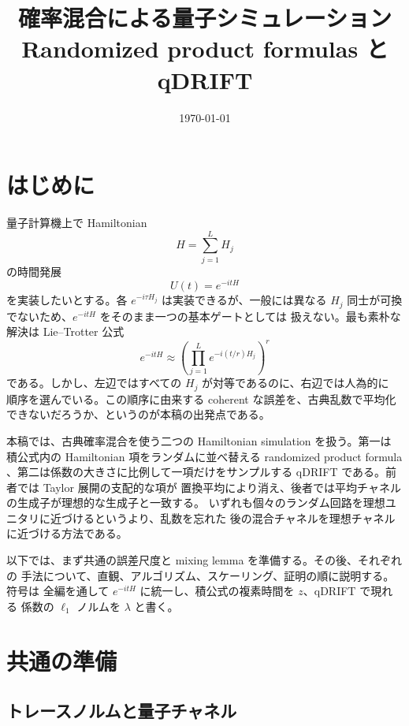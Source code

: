 \documentclass[uplatex,dvipdfmx,11pt,a4paper]{jsarticle}
\title{確率混合による量子シミュレーション\\
  \large Randomized product formulas と qDRIFT}
\author{}
\date{\today}
\begin{document}
\maketitle
\tableofcontents

\section{はじめに}

量子計算機上で Hamiltonian
\begin{equation}
  H=\sum_{j=1}^{L}H_j
\end{equation}
の時間発展
\begin{equation}
  U(t)=e^{-itH}
\end{equation}
を実装したいとする。各 $e^{-i\tau H_j}$ は実装できるが、一般には異なる
$H_j$ 同士が可換でないため、$e^{-itH}$ をそのまま一つの基本ゲートとしては
扱えない。最も素朴な解決は Lie--Trotter 公式
\begin{equation}
  e^{-itH}
  \approx
  \left(\prod_{j=1}^{L}e^{-i(t/r)H_j}\right)^r
\end{equation}
である。しかし、左辺ではすべての $H_j$ が対等であるのに、右辺では人為的に
順序を選んでいる。この順序に由来する coherent な誤差を、古典乱数で平均化
できないだろうか、というのが本稿の出発点である。

本稿では、古典確率混合を使う二つの Hamiltonian simulation を扱う。第一は
積公式内の Hamiltonian 項をランダムに並べ替える randomized product formula
\cite{Childs2019Faster}、第二は係数の大きさに比例して一項だけをサンプルする
qDRIFT \cite{Campbell2019Random} である。前者では Taylor 展開の支配的な項が
置換平均により消え、後者では平均チャネルの生成子が理想的な生成子と一致する。
いずれも個々のランダム回路を理想ユニタリに近づけるというより、乱数を忘れた
後の混合チャネルを理想チャネルに近づける方法である。

以下では、まず共通の誤差尺度と mixing lemma を準備する。その後、それぞれの
手法について、直観、アルゴリズム、スケーリング、証明の順に説明する。符号は
全編を通して $e^{-itH}$ に統一し、積公式の複素時間を $z$、qDRIFT で現れる
係数の $\ell_1$ ノルムを $\lambda$ と書く。

\section{共通の準備}

\subsection{トレースノルムと量子チャネル}
\end{document}

